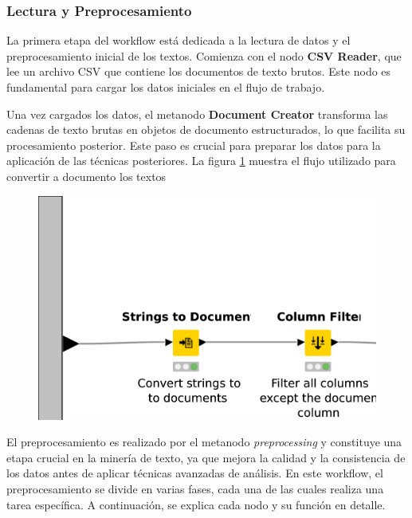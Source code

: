 \subsubsection{Lectura y Preprocesamiento}

La primera etapa del workflow está dedicada a la lectura de datos y el preprocesamiento inicial de los textos. Comienza con el nodo \textbf{CSV Reader}, que lee un archivo CSV que contiene los documentos de texto brutos. Este nodo es fundamental para cargar los datos iniciales en el flujo de trabajo.

Una vez cargados los datos, el metanodo \textbf{Document Creator} transforma las cadenas de texto brutas en objetos de documento estructurados, lo que facilita su procesamiento posterior. Este paso es crucial para preparar los datos para la aplicación de las técnicas posteriores. La figura \ref{fig:to_document} muestra el flujo utilizado para convertir a documento los textos

\begin{figure}[H]
	\centering
	\includegraphics[width=\textwidth, height=0.8\textheight, keepaspectratio]{src/to_document}
	\caption[Flujo de conversión a Documento]{}
	\label{fig:to_document}
\end{figure}

El preprocesamiento es realizado por el metanodo \textit{preprocessing} y constituye una etapa crucial en la minería de texto, ya que mejora la calidad y la consistencia de los datos antes de aplicar técnicas avanzadas de análisis. En este workflow, el preprocesamiento se divide en varias fases, cada una de las cuales realiza una tarea específica. A continuación, se explica cada nodo y su función en detalle.

